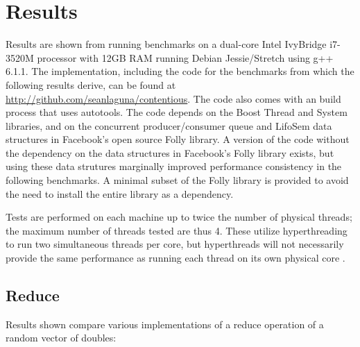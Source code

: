 \chapter{Results}

Results are shown from running benchmarks on  a dual-core Intel IvyBridge
i7-3520M processor with 12GB RAM running Debian Jessie/Stretch using g++ 6.1.1.
The implementation, including the code for the benchmarks from which the
following results derive, can be found at
\url{http://github.com/seanlaguna/contentious}. The code also comes with an
build process that uses autotools. The code depends on the Boost Thread and
System libraries, and on the concurrent producer/consumer queue and LifoSem data
structures in Facebook's open source Folly library. A version of the code
without the dependency on the data structures in Facebook's Folly library
exists, but using these data strutures marginally improved performance
consistency in the following benchmarks. A minimal subset of the Folly library
is provided to avoid the need to install the entire library as a dependency.

\begin{comment}
The second machine has 2 quad-core AMD Opteron 4386 processors with 64GB RAM
running Ubuntu 14.04 LTS using g++ 5.4.0.
\end{comment}

Tests are performed on each machine up to twice the number of physical threads;
the maximum number of threads tested are thus 4. These utilize hyperthreading to
run two simultaneous threads per core, but hyperthreads will not necessarily
provide the same performance as running each thread on its own physical core
\cite{openmp}.

\section{Reduce}
Results shown compare various implementations of a reduce operation of a random
vector of doubles:

